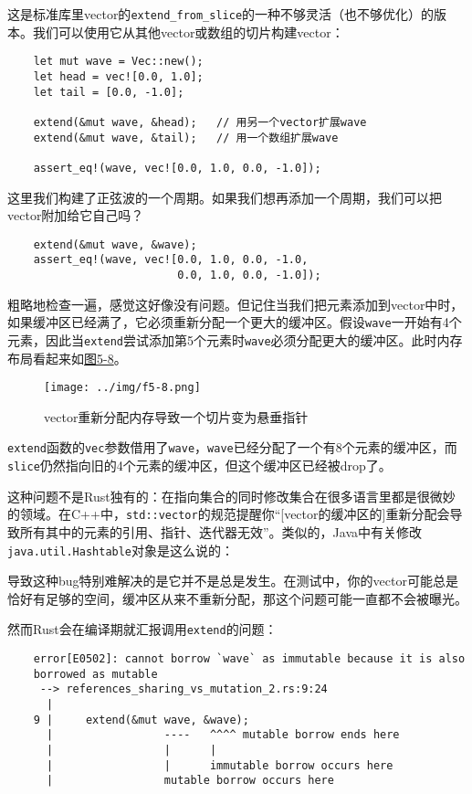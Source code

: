 这是标准库里vector的\texttt{extend\_from\_slice}的一种不够灵活（也不够优化）的版本。我们可以使用它从其他vector或数组的切片构建vector：
\begin{verbatim}
    let mut wave = Vec::new();
    let head = vec![0.0, 1.0];
    let tail = [0.0, -1.0];

    extend(&mut wave, &head);   // 用另一个vector扩展wave
    extend(&mut wave, &tail);   // 用一个数组扩展wave

    assert_eq!(wave, vec![0.0, 1.0, 0.0, -1.0]);
\end{verbatim}

这里我们构建了正弦波的一个周期。如果我们想再添加一个周期，我们可以把vector附加给它自己吗？
\begin{verbatim}
    extend(&mut wave, &wave);
    assert_eq!(wave, vec![0.0, 1.0, 0.0, -1.0,
                          0.0, 1.0, 0.0, -1.0]);
\end{verbatim}

粗略地检查一遍，感觉这好像没有问题。但记住当我们把元素添加到vector中时，如果缓冲区已经满了，它必须重新分配一个更大的缓冲区。假设\texttt{wave}一开始有4个元素，因此当\texttt{extend}尝试添加第5个元素时\texttt{wave}必须分配更大的缓冲区。此时内存布局看起来如\hyperref[f5-8]{图5-8}。

\begin{figure}[htbp]
    \centering
    \texttt{[image: ../img/f5-8.png]}
    \caption{vector重新分配内存导致一个切片变为悬垂指针}
    \label{f5-8}
\end{figure}

\texttt{extend}函数的\texttt{vec}参数借用了\texttt{wave}，\texttt{wave}已经分配了一个有8个元素的缓冲区，而\texttt{slice}仍然指向旧的4个元素的缓冲区，但这个缓冲区已经被drop了。

这种问题不是Rust独有的：在指向集合的同时修改集合在很多语言里都是很微妙的领域。在C++中，\texttt{std::vector}的规范提醒你“[vector的缓冲区的]重新分配会导致所有其中的元素的引用、指针、迭代器无效”。类似的，Java中有关修改\texttt{java.util.Hashtable}对象是这么说的：


导致这种bug特别难解决的是它并不是总是发生。在测试中，你的vector可能总是恰好有足够的空间，缓冲区从来不重新分配，那这个问题可能一直都不会被曝光。

然而Rust会在编译期就汇报调用\texttt{extend}的问题：
\begin{verbatim}
    error[E0502]: cannot borrow `wave` as immutable because it is also
    borrowed as mutable
     --> references_sharing_vs_mutation_2.rs:9:24
      |
    9 |     extend(&mut wave, &wave);
      |                 ----   ^^^^ mutable borrow ends here
      |                 |      |
      |                 |      immutable borrow occurs here
      |                 mutable borrow occurs here
\end{verbatim}

